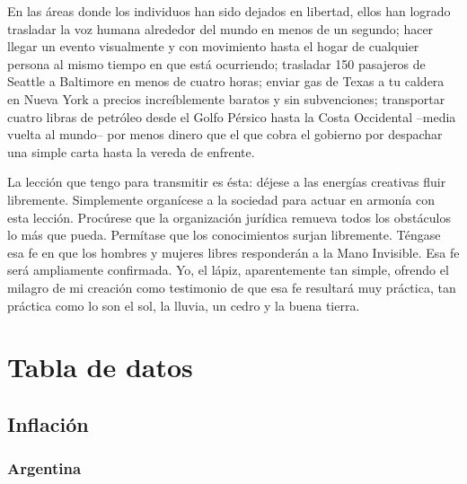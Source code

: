 \documentclass[12pt,a4paper,twoside]{book}
\begin{document}
En las áreas donde los individuos han sido dejados en libertad, ellos han logrado trasladar la voz humana alrededor del mundo en menos de un segundo; hacer llegar un evento visualmente y con movimiento hasta el hogar de cualquier persona al mismo tiempo en que está ocurriendo; trasladar 150 pasajeros de Seattle a Baltimore en menos de cuatro horas; enviar gas de Texas a tu caldera en Nueva York a precios increíblemente baratos y sin subvenciones; transportar cuatro libras de petróleo desde el Golfo Pérsico hasta la Costa Occidental –media vuelta al mundo– por menos dinero que el que cobra el gobierno por despachar una simple carta hasta la vereda de enfrente.

La lección que tengo para transmitir es ésta: déjese a las energías creativas fluir libremente. Simplemente organícese a la sociedad para actuar en armonía con esta lección. Procúrese que la organización jurídica remueva todos los obstáculos lo más que pueda. Permítase que los conocimientos surjan libremente. Téngase esa fe en que los hombres y mujeres libres responderán a la Mano Invisible. Esa fe será ampliamente confirmada. Yo, el lápiz, aparentemente tan simple, ofrendo el milagro de mi creación como testimonio de que esa fe resultará muy práctica, tan práctica como lo son el sol, la lluvia, un cedro y la buena tierra.

\chapter{Tabla de datos}

\section{Inflación}

\subsection{Argentina}


\end{document}
